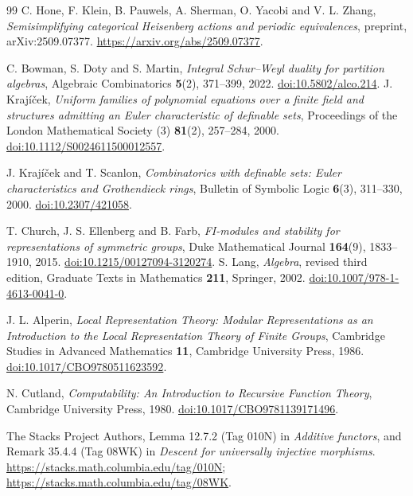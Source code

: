 \documentclass[11pt,a4paper]{article}
\theoremstyle{definition}\newtheorem{definition}[theorem]{Definition}
\theoremstyle{remark}\newtheorem{remark}[theorem]{Remark}
\begin{document}
\begin{thebibliography}{99}
C. Hone, F. Klein, B. Pauwels, A. Sherman, O. Yacobi and V. L. Zhang,
\emph{Semisimplifying categorical Heisenberg actions and periodic equivalences}, preprint,
arXiv:2509.07377.
\url{https://arxiv.org/abs/2509.07377}.

C. Bowman, S. Doty and S. Martin, \emph{Integral Schur--Weyl duality for
partition algebras}, Algebraic Combinatorics \textbf{5}(2), 371--399, 2022.
\href{https://doi.org/10.5802/alco.214}{doi:10.5802/alco.214}.
J. Kraj\'i\v cek, \emph{Uniform families of polynomial equations over a
finite field and structures admitting an Euler characteristic of definable
sets}, Proceedings of the London Mathematical Society (3)
\textbf{81}(2), 257--284, 2000.
\href{https://doi.org/10.1112/S0024611500012557}{doi:10.1112/S0024611500012557}.

J. Kraj\'i\v cek and T. Scanlon, \emph{Combinatorics with definable sets:
Euler characteristics and Grothendieck rings}, Bulletin of Symbolic Logic
\textbf{6}(3), 311--330, 2000.
\href{https://doi.org/10.2307/421058}{doi:10.2307/421058}.

T. Church, J. S. Ellenberg and B. Farb, \emph{FI-modules and stability
for representations of symmetric groups}, Duke Mathematical Journal
\textbf{164}(9), 1833--1910, 2015.
\href{https://doi.org/10.1215/00127094-3120274}{doi:10.1215/00127094-3120274}.
S. Lang, \emph{Algebra}, revised third edition,
Graduate Texts in Mathematics \textbf{211}, Springer, 2002.
\href{https://doi.org/10.1007/978-1-4613-0041-0}{doi:10.1007/978-1-4613-0041-0}.

J. L. Alperin, \emph{Local Representation Theory:
Modular Representations as an Introduction to the Local
Representation Theory of Finite Groups},
Cambridge Studies in Advanced Mathematics \textbf{11},
Cambridge University Press, 1986.
\href{https://doi.org/10.1017/CBO9780511623592}{doi:10.1017/CBO9780511623592}.

N. Cutland, \emph{Computability: An Introduction to Recursive
Function Theory}, Cambridge University Press, 1980.
\href{https://doi.org/10.1017/CBO9781139171496}{doi:10.1017/CBO9781139171496}.

The Stacks Project Authors,
Lemma 12.7.2 (Tag 010N) in \emph{Additive functors}, and
Remark 35.4.4 (Tag 08WK) in \emph{Descent for universally injective morphisms}.
\url{https://stacks.math.columbia.edu/tag/010N};
\url{https://stacks.math.columbia.edu/tag/08WK}.


\end{thebibliography}
\end{document}
